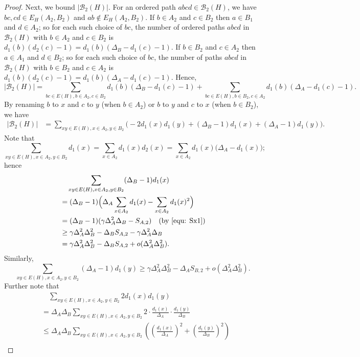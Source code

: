 \documentclass[10pt,a4paper]{amsart}
\newcommand{\bb}{\mathcal{B}}
\begin{document}
\begin{proof}
Next, we bound $|\bb_2(H)|$. For an ordered path $abcd\in \bb_2(H)$, we have  $bc,cd\in E_H(A_2,B_2)$ and $ab\notin E_H(A_2,B_2)$.
If $b\in A_2$ and $c\in B_2$ then $a\in B_1$ and $d\in A_2$; so for each such choice of $bc$, the number of  ordered paths $abcd$  in $\bb_2(H)$ with $b\in A_2$ and $c\in B_2$ is $d_1(b)(d_2(c)-1)=d_1(b)(\Delta_B-d_1(c)-1)$. If $b\in B_2$ and $c\in A_2$ then $a\in A_1$ and $d\in B_2$; so for each such choice of $bc$, the number of paths $abcd$ in $\bb_2(H)$ with $b\in B_2$ and  $c\in A_2$ is $d_1(b)(d_2(c)-1)=d_1(b)(\Delta_A-d_1(c)-1)$.
Hence, 
\[|\bb_2(H)|=\sum_{bc\in E(H), b\in A_2, c\in B_2}d_1(b)(\Delta_B-d_1(c)-1)+ \sum_{bc\in E(H), b\in B_2,c\in A_2}d_1(b)(\Delta_A-d_1(c)-1).\]
By renaming $b$ to $x$ and $c$ to $y$ (when $b\in A_2$) or $b$ to $y$ and $c$ to $x$ (when $b\in B_2$), we have  
    \begin{align*}\label{eqB2}
        |\bb_2(H)|
        &= \sum_{xy\in E(H), x\in A_2, y\in B_2}\Big(-2d_1(x)d_1(y)+ (\Delta_B -1 )d_1(x)+ (\Delta_A -1)d_1(y) \Big).
    \end{align*}
    Note that 
    $$\sum_{xy\in E(H), x\in A_2, y\in B_2} d_1(x)= \sum_{x\in A_2} d_1(x)d_2(x)=\sum_{x\in A_2}d_1(x)\Big(\Delta_A-d_1(x)\Big);$$
    hence
    \begin{align*}
     & \quad \sum_{xy\in E(H), x\in A_2,y\in B_2}(\Delta_B-1)d_1(x)\\
     &=(\Delta_B-1)\Big(\Delta_A\sum_{x\in A_2}d_1(x)-\sum_{x\in A_2}d_1(x)^2\Big)\\
     & =
     (\Delta_B -1 )( \gamma \Delta_A^2\Delta_B-S_{A,2}) \quad (\mbox{by } \eqref{equ: Sx1})\\
     & \ge \gamma \Delta_A^2\Delta_B^2-\Delta_B S_{A,2} -\gamma \Delta_A^2\Delta_B\\ &=\gamma \Delta_A^2\Delta_B^2-\Delta_B S_{A,2}+o(\Delta_A^2\Delta_B^2). 
   \end{align*}  
    Similarly, 
    $$\sum_{xy\in E(H),x\in A_2,y\in B_2}(\Delta_A-1) d_1(y)\ge  \gamma \Delta_A^2\Delta_B^2-\Delta_A S_{B,2}+o(\Delta_A^2\Delta_B^2) .$$
    Further note that 
     \begin{align*}
    &\quad \sum_{xy \in E(H),x\in A_2,y\in B_2} 2d_1(x)d_1(y) \\
    &=\Delta_A\Delta_B\sum_{xy \in E(H),x\in A_2,y\in B_2} 2\cdot \frac{d_1(x)}{\Delta_A}\cdot \frac{d_1(y)}{\Delta_B} \\   
    &\le \Delta_A\Delta_B\sum_{xy \in E(H),x\in A_2,y\in B_2}  \left(\left(\frac{d_1(x)}{\Delta_A}\right)^2+\left(\frac{d_1(y)}{\Delta_B}\right)^2\right)\\

\end{align*}
\end{proof}
\end{document}
